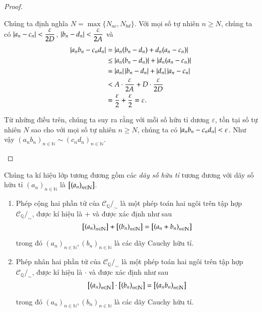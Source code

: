\begin{proof}
\begin{enumerate}[label={(\roman*)}]
              Chúng ta định nghĩa $N = \max\{ N_{ac}, N_{bd} \}$. Với mọi số tự nhiên $n\geq N$, chúng ta có $\left\vert{a_{n} - c_{n}}\right\vert < \dfrac{\varepsilon}{2D}$, $\left\vert{b_{n} - d_{n}}\right\vert < \dfrac{\varepsilon}{2A}$ và
              \begin{align*}
                  \left\vert{a_{n}b_{n} - c_{n}d_{n}}\right\vert & = \left\vert{a_{n}(b_{n} - d_{n}) + d_{n}(a_{n} - c_{n})}\right\vert               \\
                                                & \leq \left\vert{a_{n}(b_{n} - d_{n})}\right\vert + \left\vert{d_{n}(a_{n} - c_{n})}\right\vert      \\
                                                & = \left\vert{a_{n}}\right\vert\left\vert{b_{n} - d_{n}}\right\vert + \left\vert{d_{n}}\right\vert\left\vert{a_{n} - c_{n}}\right\vert \\
                                                & < A\cdot\frac{\varepsilon}{2A} + D\cdot\frac{\varepsilon}{2D}     \\
                                                & = \frac{\varepsilon}{2} + \frac{\varepsilon}{2} = \varepsilon.
              \end{align*}

              Từ những điều trên, chúng ta suy ra rằng với mỗi số hữu tỉ dương $\varepsilon$, tồn tại số tự nhiên $N$ sao cho với mọi số tự nhiên $n\geq N$, chúng ta có $\left\vert{a_{n}b_{n} - c_{n}d_{n}}\right\vert < \varepsilon$. Như vậy ${(a_{n}b_{n})}_{n\in\mathbb{N}} \sim {(c_{n}d_{n})}_{n\in\mathbb{N}}$.
    \end{enumerate}
\end{proof}

\begin{definition}
    Chúng ta kí hiệu lớp tương đương gồm các \textit{dãy số hữu tỉ} tương đương với dãy số hữu tỉ ${(a_{n})}_{n\in\mathbb{N}}$ là $\left[{\left({a_{n}}\right)}_{{n}\in\mathbb{N}}\right]$.

    \begin{enumerate}[label={(\roman*)}]
        \item Phép cộng hai phần tử của $\mathscr{C}_{\mathbb{Q}}/_{\sim}$ là một phép toán hai ngôi trên tập hợp $\mathscr{C}_{\mathbb{Q}}/_{\sim}$, được kí hiệu là $+$ và được xác định như sau
              \[
                  \left[{\left({a_{n}}\right)}_{{n}\in\mathbb{N}}\right] + \left[{\left({b_{n}}\right)}_{{n}\in\mathbb{N}}\right] = \left[{\left({a_{n} + b_{n}}\right)}_{{n}\in\mathbb{N}}\right]
              \]

              trong đó ${(a_{n})}_{n\in\mathbb{N}}, {(b_{n})}_{n\in\mathbb{N}}$ là các dãy Cauchy hữu tỉ.
        \item Phép nhân hai phần tử của $\mathscr{C}_{\mathbb{Q}}/_{\sim}$ là một phép toán hai ngôi trên tập hợp $\mathscr{C}_{\mathbb{Q}}/_{\sim}$, được kí hiệu là $\cdot$ và được xác định như sau
              \[
                  \left[{\left({a_{n}}\right)}_{{n}\in\mathbb{N}}\right] \cdot \left[{\left({b_{n}}\right)}_{{n}\in\mathbb{N}}\right] = \left[{\left({a_{n}b_{n}}\right)}_{{n}\in\mathbb{N}}\right]
              \]

              trong đó ${(a_{n})}_{n\in\mathbb{N}}, {(b_{n})}_{n\in\mathbb{N}}$ là các dãy Cauchy hữu tỉ.
    \end{enumerate}
\end{definition}

